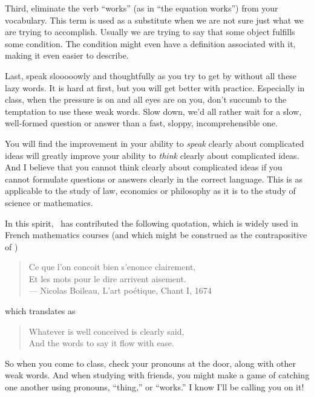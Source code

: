 %
Third, eliminate the verb ``works'' (as in ``the equation works'') from your vocabulary.  This term is used as a substitute when we are not sure just what we are trying to accomplish.  Usually we are trying to say that some object fulfills some condition.  The condition might even have a definition associated with it, making it even easier to describe.\par
%
Last, speak slooooowly and thoughtfully as you try to get by without all these lazy words.  It is hard at first, but you will get better with practice.  Especially in class, when the pressure is on and all eyes are on you, don't succumb to the temptation to use these weak words.  Slow down, we'd all rather wait for a slow, well-formed question or answer than a fast, sloppy, incomprehensible one.\par
%
You will find the improvement in your ability to {\em speak} clearly about complicated ideas will greatly improve your ability to {\em think}  clearly about complicated ideas.  And I believe that you cannot think clearly about complicated ideas if you cannot formulate questions or answers clearly in the correct language.  This is as applicable to the study of law, economics or philosophy as it is to the study of science or mathematics.\par
%
In this spirit, \hubertdupont\ has contributed the following quotation, which is widely used in French mathematics courses (and which might be construed as the contrapositive  of ) 
\begin{quote}
Ce que l'on concoit bien s'enonce clairement,\\
Et les mots pour le dire arrivent aisement.\\[1em]
--- Nicolas Boileau, L'art po\'{e}tique, Chant I, 1674
\end{quote}
%
which translates as
%
\begin{quote}
Whatever is well conceived is clearly said,\\
And the words to say it flow with ease.
\end{quote}

So when you come to class, check your pronouns at the door, along with other weak words.  And when studying with friends, you might make a game of catching one another using pronouns, ``thing,'' or ``works.''  I know I'll be calling you on it!
